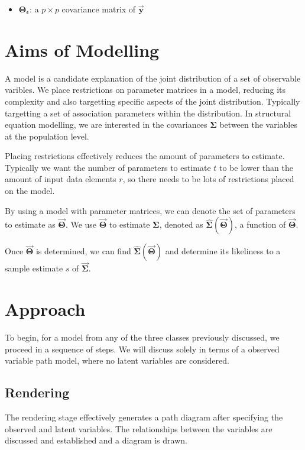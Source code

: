 \documentclass{article}
\begin{document}
\begin{multicols*}{2}
\begin{itemize}
    \item $\mathbf{\Theta_\epsilon}$: a $p \times p$ covariance matrix of $\mathbf{\vec{y}}$
    
\end{itemize}

\section{Aims of Modelling}

A model is a candidate explanation of the joint distribution of a set of observable varibles. We place restrictions on parameter matrices in a model, reducing its complexity and also targetting specific aspects of the joint distribution. Typically targetting a set of association parameters within the distribution. In structural equation modelling, we are interested in the covariances $\mathbf{\Sigma}$ between the variables at the population level.

Placing restrictions effectively reduces the amount of parameters to estimate. Typically we want the number of parameters to estimate $t$ to be lower than the amount of input data elements $r$, so there needs to be lots of restrictions placed on the model.

By using a model with parameter matrices, we can denote the set of parameters to estimate as $\mathbf{\vec{\Theta}}$. We use $\mathbf{\vec{\Theta}}$ to estimate $\mathbf{\Sigma}$, denoted as $\mathbf{\hat{\Sigma}}(\mathbf{\vec{\Theta}})$, a function of $\mathbf{\vec{\Theta}}$. 

Once $\mathbf{\vec{\Theta}}$ is determined, we can find $\mathbf{\hat{\Sigma}}(\mathbf{\vec{\Theta}})$ and determine its likeliness to a sample estimate $s$ of $\mathbf{\vec{\Sigma}}$.

\section{Approach}

To begin, for a model from any of the three classes previously discussed, we proceed in a sequence of steps. We will discuss solely in terms of a observed variable path model, where no latent variables are considered.

\subsection{Rendering}

The rendering stage effectively generates a path diagram after specifying the observed and latent variables. The relationships between the variables are discussed and established and a diagram is drawn. 


\end{multicols*}
\end{document}
